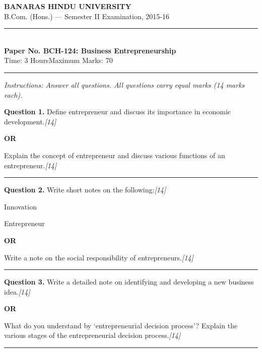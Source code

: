 \documentclass[11pt,a4paper]{article}
\newcommand{\pts}[1]{\hfill   \textit{[#1]}}
\begin{document}
\begin{center}
  {\large\bfseries BANARAS HINDU UNIVERSITY}\\[2pt]
  {\normalsize B.Com. (Hons.) --- Semester II Examination, 2015-16}\\[6pt]
  \rule{0.8\linewidth}{0.5pt}\\[6pt]
  {\large\bfseries Paper No. BCH-124: Business Entrepreneurship}\\[4pt]
  {\normalsize Time: 3 Hours\hfill Maximum Marks: 70}
\end{center}

\rule{\linewidth}{0.4pt}

\smallskip



\noindent   \textit{Instructions: Answer all questions. All questions carry equal marks (14 marks each).}

\bigskip




\noindent   \textbf{Question 1.}
Define entrepreneur and discuss its importance in economic development.\pts{14}

\centerline{   \textbf{OR}}

Explain the concept of entrepreneur and discuss various functions of an entrepreneur.\pts{14}

\medskip\rule{\linewidth}{0.2pt}




\noindent   \textbf{Question 2.}
Write short notes on the following:\pts{14}

\begin{parts}
  \item Innovation
  \item Entrepreneur
\end{parts}

\centerline{   \textbf{OR}}

Write a note on the social responsibility of entrepreneurs.\pts{14}

\medskip\rule{\linewidth}{0.2pt}




\noindent   \textbf{Question 3.}
Write a detailed note on identifying and developing a new business idea.\pts{14}

\centerline{   \textbf{OR}}

What do you understand by `entrepreneurial decision process'? Explain the various stages of the entrepreneurial decision process.\pts{14}

\medskip\rule{\linewidth}{0.2pt}
\end{document}
